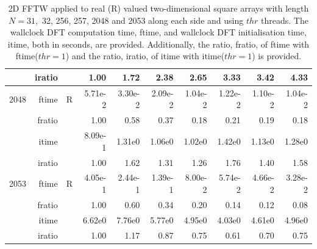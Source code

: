 \documentclass[a4paper]{article}
\begin{document}
\begin{table}[!htbp]
\begin{center}
\begin{small}
\begin{tabular}{|r|r|r|r|r|r|r|r|r|r|}
     & iratio & &       1.00 &   1.72 &   2.38 &   2.65 &   3.33 &   3.42 &   4.33      \\ \hline 
  2048  & ftime & R  &  5.71e-2 &   3.30e-2 &   2.09e-2 &   1.04e-2 &   1.22e-2 &   1.10e-2 &   1.04e-2   \\ 
      & fratio & &      1.00 &   0.58 &   0.37 &   0.18 &   0.21 &   0.19 &   0.18     \\ 
     & itime & &        8.09e-1 &   1.31e0 &   1.06e0 &   1.02e0 &   1.42e0 &   1.13e0 &   1.28e0     \\ 
     & iratio & &       1.00 &   1.62 &   1.31 &   1.26 &   1.76 &   1.40 &   1.58      \\ \hline 
  2053  & ftime & R  &  4.05e-1 &   2.44e-1 &   1.39e-1 &   8.00e-2 &   5.74e-2 &   4.66e-2 &   3.28e-2   \\ 
      & fratio & &      1.00 &   0.60 &   0.34 &   0.20 &   0.14 &   0.12 &   0.08    \\ 
     & itime & &        6.62e0 &   7.76e0 &   5.77e0 &   4.95e0 &   4.03e0 &   4.61e0 &   4.96e0     \\ 
     & iratio & &       1.00 &   1.17 &   0.87 &   0.75 &   0.61 &   0.70 &   0.75      \\ \hline 
\end{tabular}
\caption{2D FFTW applied to real (R)  valued two-dimensional square arrays with length $N=31,$ 32, 256, 257, 2048 and 2053 along each side and using $thr$ threads. The wallclock DFT computation time, ftime, and wallclock DFT initialisation time, itime, both in seconds, are provided. Additionally,  the ratio, fratio, of ftime  with ftime($thr=1$) and the ratio, iratio, of itime  with itime($thr=1$) is provided. }\label{Tbl:FFTW2d}
\end{small}
\end{center}
\end{table}
\end{document}
